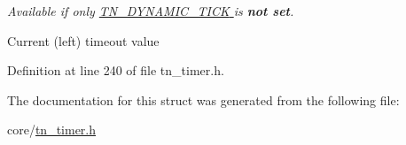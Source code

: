 {\itshape Available if only \hyperlink{tn__cfg__default_8h_aaee875834a86f961318c584095c366fe}{{\ttfamily T\+N\+\_\+\+D\+Y\+N\+A\+M\+I\+C\+\_\+\+T\+I\+C\+K} } is {\bfseries not set}.} 

Current (left) timeout value 

Definition at line 240 of file tn\+\_\+timer.\+h.



The documentation for this struct was generated from the following file\+:\begin{DoxyCompactItemize}
\item 
core/\hyperlink{tn__timer_8h}{tn\+\_\+timer.\+h}\end{DoxyCompactItemize}
